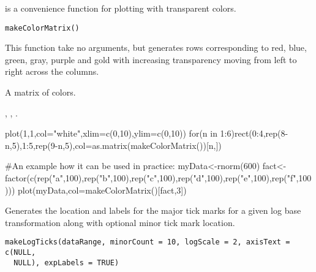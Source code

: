 \documentclass[a4paper]{book}
\begin{document}
%
\begin{Description}\relax
{} is a convenience function for plotting with transparent colors.
\end{Description}
%
\begin{Usage}
\begin{verbatim}
makeColorMatrix()
\end{verbatim}
\end{Usage}
%
\begin{Details}\relax
This function take no arguments, but generates rows corresponding to red, blue, green, gray, purple and gold with increasing transparency moving from left to right across the columns.
\end{Details}
%
\begin{Value}
A  matrix of colors.
\end{Value}
%
\begin{SeeAlso}\relax
{}, , .
\end{SeeAlso}
%
\begin{Examples}
\begin{ExampleCode}
plot(1,1,col="white",xlim=c(0,10),ylim=c(0,10))
for(n in 1:6){rect(0:4,rep(8-n,5),1:5,rep(9-n,5),col=as.matrix(makeColorMatrix())[n,])}

#An example how it can be used in practice:
myData<-rnorm(600)
fact<-factor(c(rep("a",100),rep("b",100),rep("c",100),rep("d",100),rep("e",100),rep("f",100)))
plot(myData,col=makeColorMatrix()[fact,3])
\end{ExampleCode}
\end{Examples}
%
\begin{Description}\relax
Generates the location and labels for the major tick marks for a given log base transformation along with optional minor tick mark location.
\end{Description}
%
\begin{Usage}
\begin{verbatim}
makeLogTicks(dataRange, minorCount = 10, logScale = 2, axisText = c(NULL,
  NULL), expLabels = TRUE)
\end{verbatim}
\end{Usage}
%
\end{document}
